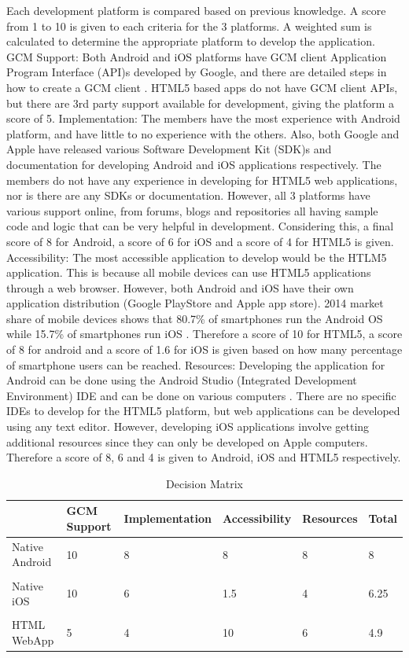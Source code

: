 \documentclass{article}
\begin{document}
Each development platform is compared based on previous knowledge. A score from 1 to 10 is given to each criteria for the 3 platforms. A weighted sum is calculated to determine the appropriate platform to develop the application.
GCM Support: Both Android and iOS platforms have GCM client Application Program Interface (API)s developed by Google, and there are detailed steps in how to create a GCM client \cite{gcm}. HTML5 based apps do not have GCM client APIs, but there are 3rd party support available for development, giving the platform a score of 5.
Implementation: The members have the most experience with Android platform, and have little to no experience with the others. Also, both Google and Apple have released various Software Development Kit (SDK)s and documentation for developing Android and iOS applications respectively. The members do not have any experience in developing for HTML5 web applications, nor is there are any SDKs or documentation. However, all 3 platforms have various support online, from forums, blogs and repositories all having sample code and logic that can be very helpful in development. Considering this, a final score of 8 for Android, a score of 6 for iOS and a score of 4 for HTML5 is given.
Accessibility: The most accessible application to develop would be the HTLM5 application. This is because all mobile devices can use HTML5 applications through a web browser. However, both Android and iOS have their own application distribution (Google PlayStore and Apple app store). 2014 market share of mobile devices shows that 80.7\% of smartphones run the Android OS while 15.7\% of smartphones run iOS \cite{market}. Therefore a score of 10 for HTML5, a score of 8 for android and a score of 1.6 for iOS is given based on how many percentage of smartphone users can be reached.
Resources: Developing the application for Android can be done using the Android Studio (Integrated Development Environment) IDE and can be done on various computers \cite{astudio}. There are no specific IDEs to develop for the HTML5 platform, but web applications can be developed using any text editor. However, developing iOS applications involve getting additional resources since they can only be developed on Apple computers.  Therefore a score of 8, 6 and 4 is given to Android, iOS and HTML5 respectively.

\begin{table}[H]
\caption{Decision Matrix}
\centering
\begin{tabularx}{\textwidth}{l l l l l Z}
\toprule
 & GCM Support & Implementation & Accessibility & Resources & Total\\
\midrule
Native Android & 10 & 8 & 8 & 8 & 8 \\\\
Native iOS & 10 & 6 & 1.5 & 4 & 6.25 \\\\
HTML WebApp & 5 & 4 & 10 & 6 & 4.9 \\
\bottomrule
\end{tabularx}
\label{tab:decision-matrix}
\end{table}
\end{document}

